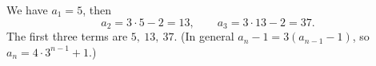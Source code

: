 We have $a_1=5$, then
\[
a_2=3\cdot5-2=13,\qquad a_3=3\cdot13-2=37 .
\]
The first three terms are $\boxed{5,\ 13,\ 37}$. (In general $a_n-1=3(a_{n-1}-1)$, so $a_n=4\cdot3^{n-1}+1$.)
